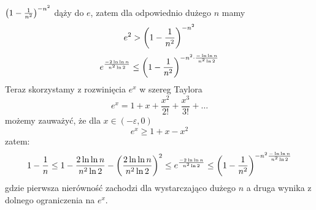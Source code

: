 \( \left(1 - \frac{1}{n^2}\right)^{-n^2} \) dąży do \( e \), zatem dla odpowiednio dużego \(n\) mamy
\[
	e^2 > \left(1 - \frac{1}{n^2}\right)^{-n^2}
\]
\[
	e^{\frac{-2 \ln \ln n}{n^2 \ln 2}} \leq \left(1 - \frac{1}{n^2}\right)^{-n^2 \cdot \frac{-\ln \ln n}{n^2 \ln 2}}
\]
Teraz skorzystamy z rozwinięcia \( e^x \) w szereg Taylora
\[
	e^x = 1 + x + \frac{x^2}{2!} + \frac{x^3}{3!} + \ldots
\]
możemy zauważyć, że dla \( x \in (-\varepsilon, 0) \)
\[
	e^x \geq 1 + x - x^2
\]
zatem:
\[
	1 - \frac{1}{n} \leq 1 - \frac{2 \ln \ln n}{n^2 \ln 2} - \left(\frac{2 \ln \ln n}{n^2 \ln 2}\right)^2 \leq e^{\frac{-2 \ln \ln n}{n^2 \ln 2}} \leq \left(1 - \frac{1}{n^2}\right)^{-n^2 \frac{- \ln \ln n}{n^2 \ln 2}}
\]
gdzie pierwsza nierówność zachodzi dla wystarczająco dużego \( n \) a druga wynika z dolnego ograniczenia na \( e^x \).
